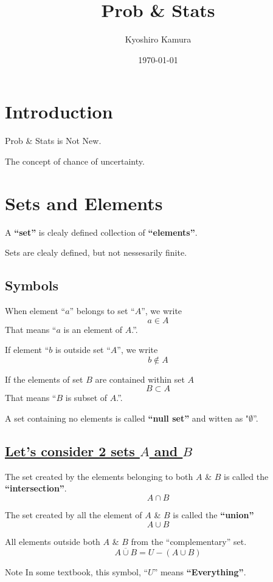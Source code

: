 \documentclass[autodetect-engine]{jsarticle}
\title{Prob \& Stats}
\author{Kyoshiro Kamura}
\date{\today}
\begin{document}
\maketitle

{\fontsize{10.5bp}{16.8bp}\selectfont
  \section{Introduction}
  Prob \& Stats is Not New.
  
  The concept of chance of uncertainty.
  
  \section{Sets and Elements}
  A \textbf{``set''} is clealy defined collection of \textbf{``elements''}.

  Sets are clealy defined, but not nessesarily finite.

  \subsection{Symbols}
  When element ``$a$'' belongs to set ``$A$'', we write
  \[
  a \in A
  \]
  That means ``$a$ is an element of $A$.''.

  If element ``$b$ is outside set ``$A$'', we write
  \[
  b \notin A
  \]

  If the elements of set $B$ are contained within set $A$
  \[
  B \subset A
  \]
  That means ``$B$ is subset of $A$.''.

  A set containing no elements is called \textbf{``null set''}
  and witten as "$\emptyset$''.

  \subsection*{\underline{Let's consider 2 sets $A$ and $B$}}
  The set created by the elements belonging to both $A$ \& $B$ is called the \textbf{``intersection''}.
  \[
  A \cap B
  \]

  The set created by all the element of $A$ \& $B$ is called the \textbf{``union''}
  \[
  A \cup B
  \]

  All elements outside both $A$ \& $B$ from the ``complementary'' set.
  \[
  \overline{A \cup B} = U - (A \cup B)
  \]
  \begin{itembox}[l]{Note}
    In some textbook, this symbol, ``$U$'' means \textbf{``Everything''}.
  \end{itembox}

}
\end{document}
